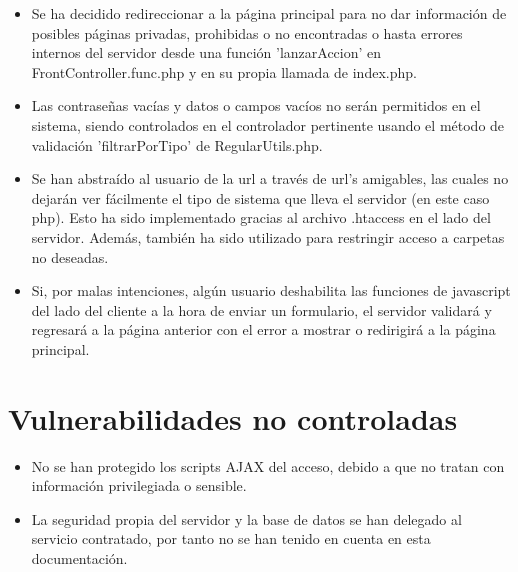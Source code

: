 \begin{itemize}
\item Se ha decidido redireccionar a la p\'{a}gina principal para no dar informaci\'{o}n de posibles p\'{a}ginas privadas, prohibidas o no encontradas o hasta errores internos del servidor desde una funci\'{o}n 'lanzarAccion' en FrontController.func.php y en su propia llamada de index.php.

\item Las contrase\~{n}as vac\'{i}as y datos o campos vac\'{i}os no ser\'{a}n permitidos en el sistema, siendo controlados en el controlador pertinente usando el m\'{e}todo de validaci\'{o}n 'filtrarPorTipo' de RegularUtils.php.

\item Se han abstra\'{i}do al usuario de la url a trav\'{e}s de url's amigables, las cuales no dejar\'{a}n ver f\'{a}cilmente el tipo de sistema que lleva el servidor (en este caso php). Esto ha sido implementado gracias al archivo .htaccess en el lado del servidor. Adem\'{a}s, tambi\'{e}n ha sido utilizado para restringir acceso a carpetas no deseadas.

\item Si, por malas intenciones, alg\'{u}n usuario deshabilita las funciones de javascript del lado del cliente a la hora de enviar un formulario, el servidor validará y regresará a la página anterior con el error a mostrar o redirigirá a la página principal.

\end{itemize}
\section{Vulnerabilidades no controladas}

\begin{itemize}
\item No se han protegido los scripts AJAX del acceso, debido a que no tratan con informaci\'{o}n privilegiada o sensible.
\item La seguridad propia del servidor y la base de datos se han delegado al servicio contratado, por tanto no se han tenido en cuenta en esta documentaci\'{o}n.
\end{itemize}



